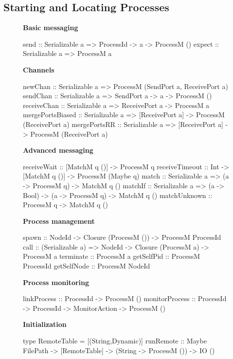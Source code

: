 \documentclass[preprint]{sigplanconf}
\begin{document}
\subsection{Starting and Locating Processes}

\begin{figure}[t!]
\small
\renewcommand{\baselinestretch}{0}
\textbf{Basic messaging} 
\begin{code}
send   :: Serializable a => ProcessId -> a
       -> ProcessM ()
expect :: Serializable a => ProcessM a
\end{code}
 \textbf{Channels}
\begin{code}
newChan  :: Serializable a 
         => ProcessM (SendPort a, ReceivePort a)
sendChan :: Serializable a 
         => SendPort a -> a -> ProcessM ()
receiveChan :: Serializable a => ReceivePort a
            -> ProcessM a
mergePortsBiased :: Serializable a => [ReceivePort a]
                 -> ProcessM (ReceivePort a)
mergePortsRR :: Serializable a => [ReceivePort a] 
             -> ProcessM (ReceivePort a)
\end{code}

 \textbf{Advanced messaging}
\begin{code}
receiveWait    :: [MatchM q ()] -> ProcessM q
receiveTimeout :: Int -> [MatchM q ()] 
               -> ProcessM (Maybe q)
match   :: Serializable a => (a -> ProcessM q) 
        -> MatchM q ()
matchIf :: Serializable a => (a -> Bool) 
        -> (a -> ProcessM q) -> MatchM q ()
matchUnknown :: ProcessM q -> MatchM q ()
\end{code}

 \textbf{Process management}
\begin{code}
spawn :: NodeId -> Closure (ProcessM ()) 
      -> ProcessM ProcessId
call :: (Serializable a) => NodeId -> 
        Closure (ProcessM a) -> ProcessM a
terminate :: ProcessM a
getSelfPid :: ProcessM ProcessId
getSelfNode :: ProcessM NodeId
\end{code}

 \textbf{Process monitoring}
\begin{code}
linkProcess :: ProcessId -> ProcessM ()
monitorProcess :: ProcessId -> ProcessId 
               -> MonitorAction -> ProcessM ()
\end{code}

 \textbf{Initialization}
\begin{code}
type RemoteTable = [(String,Dynamic)]
runRemote      :: Maybe FilePath -> [RemoteTable] 
               -> (String -> ProcessM ()) -> IO ()


\end{code}
\end{figure}
\end{document}

